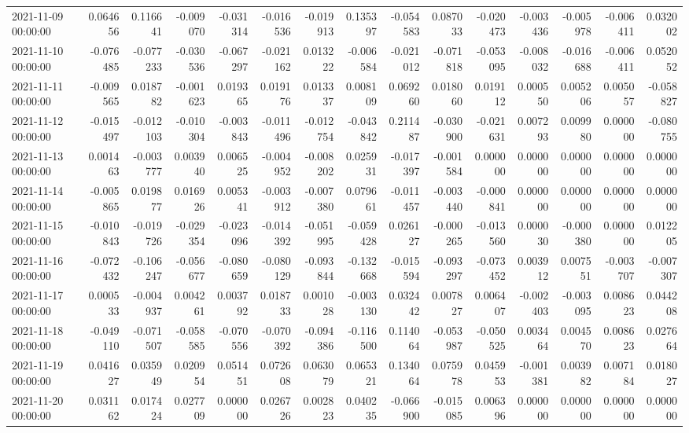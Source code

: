\begin{tabular}{lrrrrrrrrrrrrrr}
2021-11-09 00:00:00 & 0.064656 & 0.116641 & -0.009070 & -0.031314 & -0.016536 & -0.019913 & 0.135397 & -0.054583 & 0.087033 & -0.020473 & -0.003436 & -0.005978 & -0.006411 & 0.032002 \\
2021-11-10 00:00:00 & -0.076485 & -0.077233 & -0.030536 & -0.067297 & -0.021162 & 0.013222 & -0.006584 & -0.021012 & -0.071818 & -0.053095 & -0.008032 & -0.016688 & -0.006411 & 0.052052 \\
2021-11-11 00:00:00 & -0.009565 & 0.018782 & -0.001623 & 0.019365 & 0.019176 & 0.013337 & 0.008109 & 0.069260 & 0.018060 & 0.019112 & 0.000550 & 0.005206 & 0.005057 & -0.058827 \\
2021-11-12 00:00:00 & -0.015497 & -0.012103 & -0.010304 & -0.003843 & -0.011496 & -0.012754 & -0.043842 & 0.211487 & -0.030900 & -0.021631 & 0.007293 & 0.009980 & 0.000000 & -0.080755 \\
2021-11-13 00:00:00 & 0.001463 & -0.003777 & 0.003940 & 0.006525 & -0.004952 & -0.008202 & 0.025931 & -0.017397 & -0.001584 & 0.000000 & 0.000000 & 0.000000 & 0.000000 & 0.000000 \\
2021-11-14 00:00:00 & -0.005865 & 0.019877 & 0.016926 & 0.005341 & -0.003912 & -0.007380 & 0.079661 & -0.011457 & -0.003440 & -0.000841 & 0.000000 & 0.000000 & 0.000000 & 0.000000 \\
2021-11-15 00:00:00 & -0.010843 & -0.019726 & -0.029354 & -0.023096 & -0.014392 & -0.051995 & -0.059428 & 0.026127 & -0.000265 & -0.013560 & 0.000030 & -0.000380 & 0.000000 & 0.012205 \\
2021-11-16 00:00:00 & -0.072432 & -0.106247 & -0.056677 & -0.080659 & -0.080129 & -0.093844 & -0.132668 & -0.015594 & -0.093297 & -0.073452 & 0.003912 & 0.007551 & -0.003707 & -0.007307 \\
2021-11-17 00:00:00 & 0.000533 & -0.004937 & 0.004261 & 0.003792 & 0.018733 & 0.001028 & -0.003130 & 0.032442 & 0.007827 & 0.006407 & -0.002403 & -0.003095 & 0.008623 & 0.044208 \\
2021-11-18 00:00:00 & -0.049110 & -0.071507 & -0.058585 & -0.070556 & -0.070392 & -0.094386 & -0.116500 & 0.114064 & -0.053987 & -0.050525 & 0.003464 & 0.004570 & 0.008623 & 0.027664 \\
2021-11-19 00:00:00 & 0.041627 & 0.035949 & 0.020954 & 0.051451 & 0.072608 & 0.063079 & 0.065321 & 0.134064 & 0.075978 & 0.045953 & -0.001381 & 0.003982 & 0.007184 & 0.018027 \\
2021-11-20 00:00:00 & 0.031162 & 0.017424 & 0.027709 & 0.000000 & 0.026726 & 0.002823 & 0.040235 & -0.066900 & -0.015085 & 0.006396 & 0.000000 & 0.000000 & 0.000000 & 0.000000 \\

\end{tabular}
